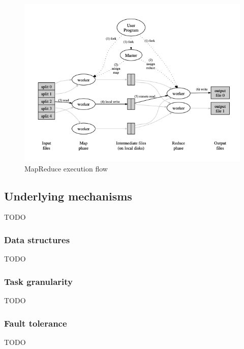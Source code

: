 \begin{figure}[H]
    \centering
    \includegraphics[width=\linewidth]{document/chapters/chapter_4/images/mapreduce_execution_flow.png}
    \caption{MapReduce execution flow \cite{google_mapreduce}}
    \label{fig:mapreduce_execution_flow}
\end{figure}

\subsection{Underlying mechanisms}
TODO

\subsubsection{Data structures}
TODO

\subsubsection{Task granularity}
TODO

\subsubsection{Fault tolerance}
TODO

